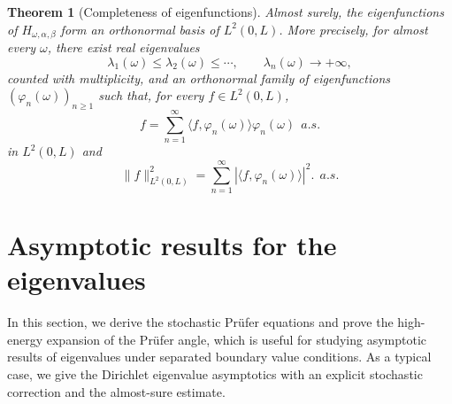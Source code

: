 \documentclass[11pt]{article}
\newtheorem{theorem}{Theorem}[section]
\begin{document}
\begin{theorem}[Completeness of eigenfunctions]
Almost surely, the eigenfunctions of $H_{\omega,\alpha,\beta}$ form an orthonormal basis of $L^2(0,L)$. More precisely, for almost every $\omega$, there exist real eigenvalues
\[
    \lambda_1(\omega)\le\lambda_2(\omega)\le\cdots,
    \qquad \lambda_n(\omega)\to+\infty,
\]
counted with multiplicity, and an orthonormal family of eigenfunctions $(\varphi_n(\omega))_{n\ge1}$ such that, for every $f\in L^2(0,L)$,
\[
    f=\sum_{n=1}^\infty \langle f,\varphi_n(\omega)\rangle\varphi_n(\omega)~~a.s.
\]
in $L^2(0,L)$ and
\[
    \|f\|_{L^2(0,L)}^2=\sum_{n=1}^\infty |\langle f,\varphi_n(\omega)\rangle|^2.~~a.s.
\]
\end{theorem}



\section{Asymptotic results for the eigenvalues}
In this section, we derive the stochastic Pr\"ufer equations and prove the high-energy expansion of the Pr\"ufer angle, which is useful for studying asymptotic results of eigenvalues under separated boundary value conditions. As a typical case, we give the Dirichlet eigenvalue asymptotics with an explicit stochastic correction and the almost-sure estimate.
\end{document}
